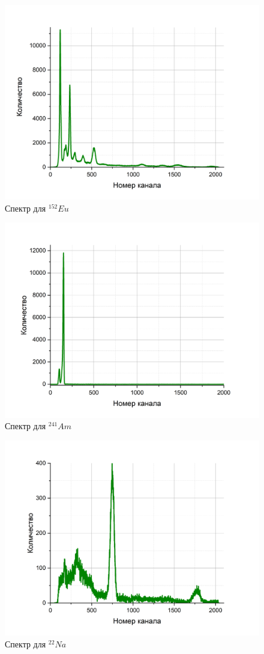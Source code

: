 \documentclass[a4paper,12pt]{article}
\begin{document}
\newpage

\begin{figure}[h!]
	\centering
	\includegraphics[width=0.8\linewidth]{graph5}
	\caption{Спектр для $^{152}Eu$}
	\label{graph4:Eu}
\end{figure}

\begin{figure}[h!]
	\centering
	\includegraphics[width=0.8\linewidth]{graph6}
	\caption{Спектр для $^{241}Am$}
	\label{graph5:Am}
\end{figure}

\newpage

\begin{figure}[h!]
	\centering
	\includegraphics[width=0.8\linewidth]{graph7}
	\caption{Спектр для $^{22}Na$}
	\label{graph6:Na}
\end{figure} 
\end{document}
